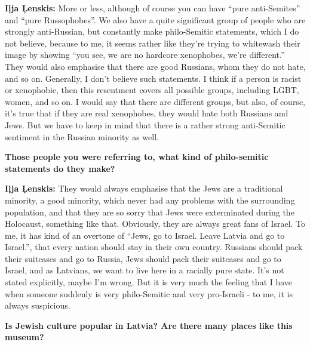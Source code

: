 \textbf{Iļja Ļenskis:} More or less, although of course you can have ``pure anti-Semites'' and ``pure Russophobes''. We also have a quite significant group of people who are strongly anti-Russian, but constantly make philo-Semitic statements, which I do not believe, because to me, it seems rather like they’re trying to whitewash their image by showing ``you see, we are no hardcore xenophobes, we’re different.'' They would also emphasise that there are good Russians, whom they do not hate, and so on. Generally, I don’t believe such statements. I think if a person is racist or xenophobic, then this resentment covers all possible groups, including LGBT, women, and so on. I would say that there are different groups, but also, of course, it’s true that if they are real xenophobes, they would hate both Russians and Jews. But we have to keep in mind that there is a rather strong anti-Semitic sentiment in the Russian minority as well. 

\textbf{Those people you were referring to, what kind of philo-semitic statements do they make?} 

\textbf{Iļja Ļenskis:} They would always emphasise that the Jews are a traditional minority, a good minority, which never had any problems with the surrounding population, and that they are so sorry that Jews were exterminated during the Holocaust, something like that. Obviously, they are always great fans of Israel. To me, it has kind of an overtone of  ``Jews, go to Israel. Leave Latvia and go to Israel.'', that every nation should stay in their own country. Russians should pack their suitcases and go to Russia, Jews should pack their suitcases and go to Israel, and as Latvians, we want to live here in a racially pure state. It’s not stated explicitly, maybe I’m wrong. But it is very much the feeling that I have when someone suddenly is very philo-Semitic and very pro-Israeli - to me, it is always suspicious. 

\textbf{Is Jewish culture popular in Latvia? Are there many places like this museum?}


